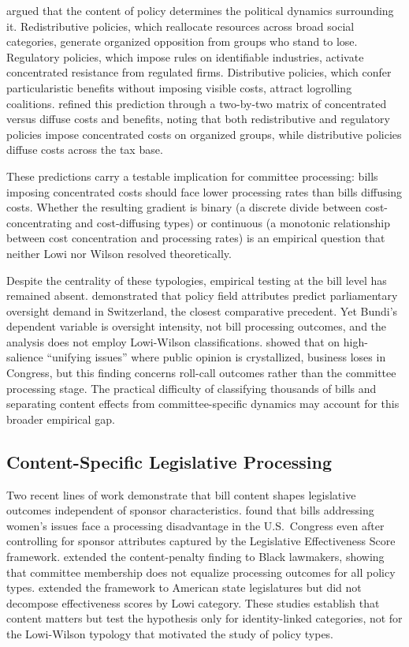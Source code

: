 \documentclass[11pt]{article}
\begin{document}
\citet{lowi1964} argued that the content of policy determines the political dynamics surrounding it. Redistributive policies, which reallocate resources across broad social categories, generate organized opposition from groups who stand to lose. Regulatory policies, which impose rules on identifiable industries, activate concentrated resistance from regulated firms. Distributive policies, which confer particularistic benefits without imposing visible costs, attract logrolling coalitions. \citet{wilson1980} refined this prediction through a two-by-two matrix of concentrated versus diffuse costs and benefits, noting that both redistributive and regulatory policies impose concentrated costs on organized groups, while distributive policies diffuse costs across the tax base.

These predictions carry a testable implication for committee processing: bills imposing concentrated costs should face lower processing rates than bills diffusing costs. Whether the resulting gradient is binary (a discrete divide between cost-concentrating and cost-diffusing types) or continuous (a monotonic relationship between cost concentration and processing rates) is an empirical question that neither Lowi nor Wilson resolved theoretically.

Despite the centrality of these typologies, empirical testing at the bill level has remained absent. \citet{bundi2017} demonstrated that policy field attributes predict parliamentary oversight demand in Switzerland, the closest comparative precedent. Yet Bundi's dependent variable is oversight intensity, not bill processing outcomes, and the analysis does not employ Lowi-Wilson classifications. \citet{smith1999} showed that on high-salience ``unifying issues'' where public opinion is crystallized, business loses in Congress, but this finding concerns roll-call outcomes rather than the committee processing stage. The practical difficulty of classifying thousands of bills and separating content effects from committee-specific dynamics may account for this broader empirical gap.

\subsection{Content-Specific Legislative Processing}

Two recent lines of work demonstrate that bill content shapes legislative outcomes independent of sponsor characteristics. \citet{volden2016} found that bills addressing women's issues face a processing disadvantage in the U.S.\ Congress even after controlling for sponsor attributes captured by the Legislative Effectiveness Score framework. \citet{peay2020} extended the content-penalty finding to Black lawmakers, showing that committee membership does not equalize processing outcomes for all policy types. \citet{bucchianeri2024} extended the framework to American state legislatures but did not decompose effectiveness scores by Lowi category. These studies establish that content matters but test the hypothesis only for identity-linked categories, not for the Lowi-Wilson typology that motivated the study of policy types.
\end{document}
